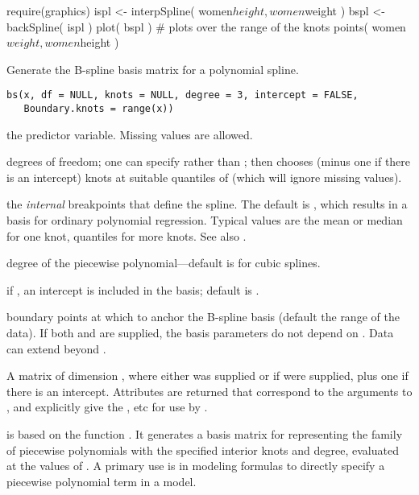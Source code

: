 %
\begin{Examples}
\begin{ExampleCode}
require(graphics)
ispl <- interpSpline( women$height, women$weight )
bspl <- backSpline( ispl )
plot( bspl )                   # plots over the range of the knots
points( women$weight, women$height )
\end{ExampleCode}
\end{Examples}
%
\begin{Description}\relax
Generate the B-spline basis matrix for a polynomial spline.
\end{Description}
%
\begin{Usage}
\begin{verbatim}
bs(x, df = NULL, knots = NULL, degree = 3, intercept = FALSE,
   Boundary.knots = range(x))
\end{verbatim}
\end{Usage}
%
\begin{Arguments}
\begin{ldescription}
\item[\code{x}] the predictor variable.  Missing values are allowed.
\item[\code{df}] degrees of freedom; one can specify  rather than
;  then chooses  (minus one
if there is an intercept) knots at suitable quantiles of 
(which will ignore missing values).
\item[\code{knots}] the \emph{internal} breakpoints that define the
spline.  The default is , which results in a basis for
ordinary polynomial regression.  Typical values are the mean or
median for one knot, quantiles for more knots.  See also
.
\item[\code{degree}] degree of the piecewise polynomial---default is  for
cubic splines.
\item[\code{intercept}] if , an intercept is included in the
basis; default is .
\item[\code{Boundary.knots}] boundary points at which to anchor the B-spline
basis (default the range of the data). If both  and
 are supplied, the basis parameters do not
depend on . Data can extend beyond .
\end{ldescription}
\end{Arguments}
%
\begin{Value}
A matrix of dimension , where either 
was supplied or if  were supplied,  plus one if there is an intercept.  Attributes
are returned that correspond to the arguments to , and
explicitly give the ,  etc for use by
.

 is based on the function .
It generates a basis matrix for
representing the family of piecewise polynomials with the specified
interior knots and degree, evaluated at the values of .  A
primary use is in modeling formulas to directly specify a piecewise
polynomial term in a model.
\end{Value}
